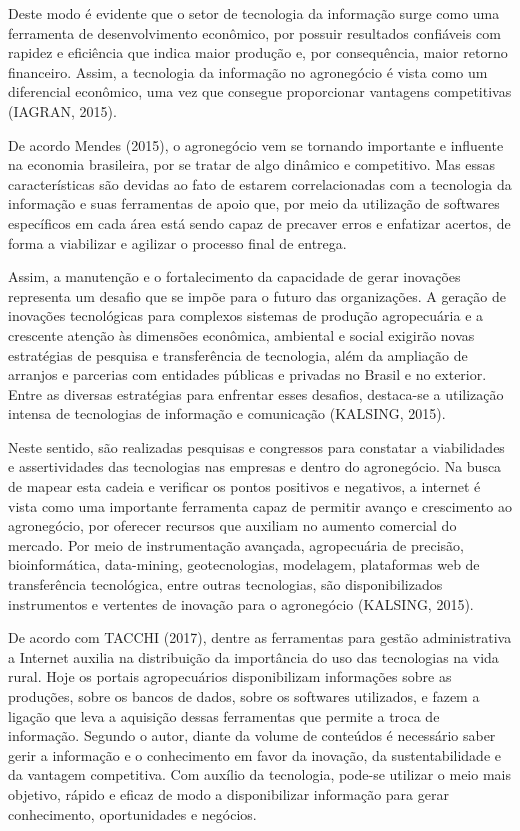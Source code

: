 \documentclass[eso]{bcc}
\begin{document}
Deste modo é evidente que o setor de tecnologia da informação surge como uma ferramenta de 
desenvolvimento econômico, por possuir resultados confiáveis com rapidez e eficiência que 
indica maior produção e, por consequência, maior retorno financeiro. Assim, a tecnologia da 
informação no agronegócio é vista como um diferencial econômico, uma vez que consegue proporcionar 
vantagens competitivas (IAGRAN, 2015).

De acordo Mendes (2015), o agronegócio vem se tornando importante e influente na economia 
brasileira, por se tratar de algo dinâmico e competitivo. Mas essas características são devidas 
ao fato de estarem correlacionadas com a tecnologia da informação e suas ferramentas de apoio que, 
por meio da utilização de softwares específicos em cada área está sendo capaz de precaver erros 
e enfatizar acertos, de forma a viabilizar e agilizar o processo final de entrega.

Assim, a manutenção e o fortalecimento da capacidade de gerar inovações representa um desafio 
que se impõe para o futuro das organizações. A geração de inovações tecnológicas para complexos 
sistemas de produção agropecuária e a crescente atenção às dimensões econômica, ambiental e 
social exigirão novas estratégias de pesquisa e transferência de tecnologia, além da ampliação 
de arranjos e parcerias com entidades públicas e privadas no Brasil e no exterior. 
Entre as diversas estratégias para enfrentar esses desafios, destaca-se a utilização 
intensa de tecnologias de informação e comunicação (KALSING, 2015).

Neste sentido, são realizadas pesquisas e congressos para constatar a viabilidades e 
assertividades das tecnologias nas empresas e dentro do agronegócio. Na busca de mapear 
esta cadeia e verificar os pontos positivos e negativos, a internet é vista como uma importante 
ferramenta capaz de permitir avanço e crescimento ao agronegócio, por oferecer recursos que 
auxiliam no aumento comercial do mercado. Por meio de instrumentação avançada, agropecuária de 
precisão, bioinformática, data-mining, geotecnologias, modelagem, plataformas web de 
transferência tecnológica, entre outras tecnologias, são disponibilizados instrumentos e 
vertentes de inovação para o agronegócio (KALSING, 2015).

De acordo com TACCHI (2017), dentre as ferramentas para gestão administrativa a Internet 
auxilia na distribuição da importância do uso das tecnologias na vida rural. Hoje os portais 
agropecuários disponibilizam informações sobre as produções, sobre os bancos de dados, sobre 
os softwares utilizados, e fazem a ligação que leva a aquisição dessas ferramentas que permite 
a troca de informação. Segundo o autor, diante da volume de conteúdos é necessário saber gerir 
a informação e o conhecimento em favor da inovação, da sustentabilidade e da vantagem competitiva. 
Com auxílio da tecnologia, pode-se utilizar o meio mais objetivo, rápido e eficaz de modo a 
disponibilizar informação para gerar conhecimento, oportunidades e negócios. 
\end{document}
